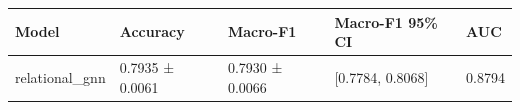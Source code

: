 \begin{tabular}{lllll}
\toprule
Model & Accuracy & Macro-F1 & Macro-F1 95\% CI & AUC \\
\midrule
relational\_gnn & 0.7935 ± 0.0061 & 0.7930 ± 0.0066 & [0.7784, 0.8068] & 0.8794 \\
\bottomrule
\end{tabular}
